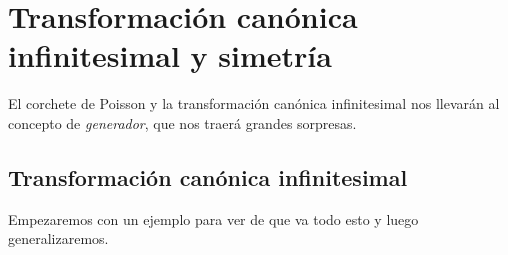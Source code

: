 \chapter{Transformación canónica infinitesimal y simetría}



\vspace{10mm}
\begin{adjustwidth}{50pt}{50pt}
\begin{ejemplo}

El corchete de Poisson y la transformación canónica infinitesimal nos llevarán al concepto de \emph{generador}, que nos traerá grandes sorpresas. 

\end{ejemplo}
\end{adjustwidth}
\vspace{5mm}
\section{Transformación canónica infinitesimal}
\vspace{5mm}

Empezaremos con un ejemplo para ver de que va todo esto y luego generalizaremos.

